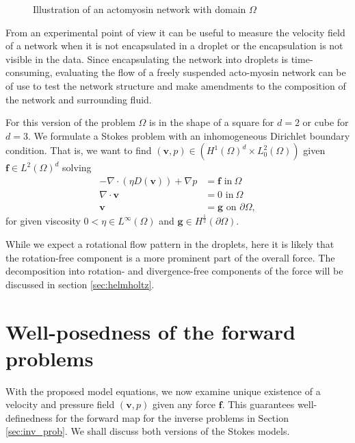 \documentclass[final,leqno]{scrarticle}
\newcommand{\Hd}{{H^1(\Omega)^d}}
\newcommand{\lzd}{{L^2(\Omega)^d}}
\begin{document}
\begin{figure}
    \centering
    \def\svgwidth{200pt}
    
    \caption{Illustration of an actomyosin network with domain $\Omega$}
    \label{fig:bc_dirichlet}
\end{figure}

From an experimental point of view it can be useful to measure the velocity field of a network when it is not encapsulated in a droplet or the encapsulation is not visible in the data. Since encapsulating the network into droplets is time-consuming, evaluating the flow of a freely suspended acto-myosin network can be of use to test the network structure and make amendments to the composition of the network and surrounding fluid.

For this version of the problem $\Omega$ is in the shape of a square for $d=2$ or cube for $d=3$. We formulate a Stokes problem with an inhomogeneous Dirichlet boundary condition. That is, we want to find 
$(\mathbf{v},p) \in (\Hd\times L_0^2(\Omega))$ given $\mathbf{f}\in \lzd$ solving
\begin{equation}
\begin{split}
- \nabla \cdot (\eta D(\mathbf{v})) + \nabla p &= \mathbf{f}  \text{ in} \ \Omega\\
\nabla \cdot  \mathbf{v} &= 0  \text{ in} \ \Omega  \\
\mathbf{v} &= \mathbf{g}  \text{ on }  \partial \Omega , 
 \end{split} 
 \end{equation}
for given viscosity $0<\eta\in L^\infty(\Omega)$ and $\mathbf{g}\in H^{\frac{1}{2}}(\partial\Omega)$.


While we expect a rotational flow pattern in the droplets, here it is likely that the rotation-free component is a more prominent part of the overall force. The decomposition into rotation- and divergence-free components of the force will be discussed in section \ref{sec:helmholtz}.






\section{Well-posedness of the forward problems\label{Sec:3}} 
With the proposed model equations, we now examine unique existence of a velocity and pressure field $(\mathbf{v},p)$ given any force $\mathbf{f}$. This guarantees well-definedness for the forward map for the inverse problems in Section \ref{sec:inv_prob}.
We shall discuss both versions of the Stokes models.
\end{document}
